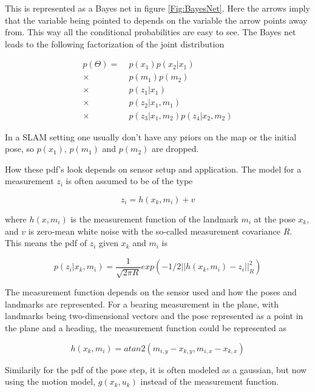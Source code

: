 This is represented as a Bayes net in figure \ref{Fig:BayesNet}. Here the arrows imply that the variable being pointed to depends on the variable the arrow points away from. This way all the conditional probabilities are easy to see. The Bayes net leads to the following factorization of the joint distribution

\begin{align}
    p(\Theta) = \; & p(x_1)p(x_2|x_1) \\
    \times \; &p(m_1)p(m_2) \nonumber \\
    \times \; &p(z_1|x_1) \nonumber \\
    \times \; &p(z_2|x_1,m_1) \nonumber \\ 
    \times \; &p(z_3|x_1,m_2)p(z_4|x_2,m_2) \nonumber 
\end{align}

In a SLAM setting one usually don't have any priors on the map or the initial pose, so $p(x_1)$, $p(m_1)$ and $p(m_2)$ are dropped. 

How these pdf's look depends on sensor setup and application. The model for a measurement $z_i$ is often assumed to be of the type

\begin{equation}
    z_i = h(x_k,m_i) + v
\end{equation}

where $h(x,m_i)$ is the measurement function of the landmark $m_i$ at the pose $x_k$, and $v$ is zero-mean white noise with the so-called measurement covariance $R$. This means the pdf of $z_i$ given $x_k$ and $m_i$ is 

\begin{equation}
    p(z_i|x_k,m_i) = \frac{1}{\sqrt{2\pi R}}exp(-1/2||h(x_k,m_i) - z_i||^2_R)
\end{equation}

The measurement function depends on the sensor used and how the poses and landmarks are represented. For a bearing measurement in the plane, with landmarks being two-dimensional vectors and the pose represented as a point in the plane and a heading, the measurement function could be represented as

\begin{equation}
    h(x_k,m_i) = atan2(m_{i,y} - x_{k,y},m_{i,x} - x_{k,x})
\end{equation}

Similarily for the pdf of the pose step, it is often modeled as a gaussian, but now using the motion model, $g(x_k,u_k)$ instead of the measurement function. 

